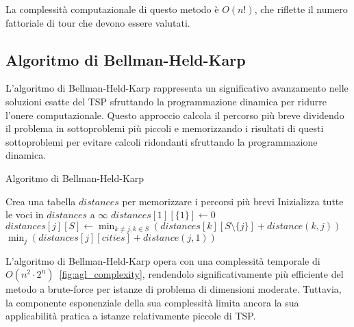 La complessità computazionale di questo metodo è $O(n!)$, che riflette il numero fattoriale di tour che devono essere valutati.

\subsection{Algoritmo di Bellman-Held-Karp}

L'algoritmo di Bellman-Held-Karp rappresenta un significativo avanzamento nelle soluzioni esatte del \gls{TSP} sfruttando la programmazione dinamica per ridurre l'onere computazionale. Questo approccio calcola il percorso più breve dividendo il problema in sottoproblemi più piccoli e memorizzando i risultati di questi sottoproblemi per evitare calcoli ridondanti sfruttando la programmazione dinamica.

\begin{algorithm}
	\caption{Algoritmo di Bellman-Held-Karp}\label{bellmanheldkarp}
	\begin{algorithmic}[1]
		\State Crea una tabella $distances$ per memorizzare i percorsi più brevi
		\State Inizializza tutte le voci in $distances$ a $\infty$
		\State $distances[1][\{1\}] \gets 0$ 
		\State $distances[j][S] \gets \min_{k \neq j, k \in S} (distances[k][S\setminus\{j\}] + distance(k, j))$
		\EndFor
		\EndFor
		\EndFor
		\State \Return $\min_{j}(distances[j][cities] + distance(j, 1))$
		\EndProcedure
	\end{algorithmic}
\end{algorithm}

L'algoritmo di Bellman-Held-Karp opera con una complessità temporale di $O(n^2 \cdot 2^n)$~\ref{fig:agl_complexity}, rendendolo significativamente più efficiente del metodo a brute-force per istanze di problema di dimensioni moderate. Tuttavia, la componente esponenziale della sua complessità limita ancora la sua applicabilità pratica a istanze relativamente piccole di \gls{TSP}.



